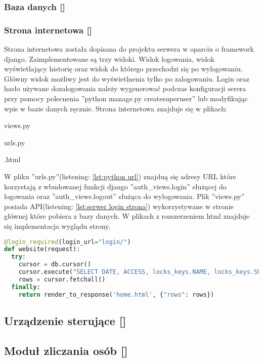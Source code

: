 	\subsubsection[Baza danych]{Baza danych [\StudentA]}
	
	
	\subsubsection[Strona internetowa]{Strona internetowa [\StudentB]}
	Strona internetowa została dopisana do projektu serwera w oparciu o framework django. Zaimplementowane są trzy widoki. Widok logowania, widok wyświetlający historię oraz widok do którego przechodzi się po wylogowaniu. Główny widok możliwy jest do wyświetlnenia tylko po zalogowaniu. Login oraz hasło używane dozalogowania należy wygenerować podczas konfiguracji serera przy pomocy polecnenia ''python manage.py createsuperuser'' lub modyfikując wpis w bazie danych ręcznie. Strona internetowa znajduje się w plikach:
	\begin{itemize*}
		\item views.py
		\item urls.py
		\item *.html
	\end{itemize*}
 
	W pliku ''urls.py''(listening: \ref{lst:python url}) znajduą się adresy URL które korzystają z wbudowanej funkcji django ''auth\_views.login'' służącej do logowania oraz ''auth\_views.logout'' służąca do wylogowania. Plik ''views.py'' posiada API(listening: \ref{lst:serwer login strona}) wykorzystywane w stronie głównej które pobiera z bazy danych. W plikach z rozszerzeniem html znajduje się implementacja wyglądu strony.
	
	{\footnotesize 
		\begin{lstlisting}[caption={API logowania do strony internetowej}, label={lst:serwer login strona}, language=Python]	
	@login_required(login_url="login/")
def website(request):
  try:
    cursor = db.cursor()
    cursor.execute("SELECT DATE, ACCESS, locks_keys.NAME, locks_keys.SURNAME, locks.NAME AS 'ZAMEK' FROM access_to_locks, locks_keys, locks WHERE locks_keys.ID_KEY = access_to_locks.ID_KEY AND locks.ID_LOCK = access_to_locks.ID_KEY ORDER BY DATE DESC")
    rows = cursor.fetchall()
  finally:
    return render_to_response('home.html', {"rows": rows})
		\end{lstlisting}}
	
	
\newpage
\subsection[Urządzenie sterujące]{Urządzenie sterujące [\StudentA]}

\newpage
\subsection[Moduł zliczania osób]{Moduł zliczania osób [\StudentA]}


 
